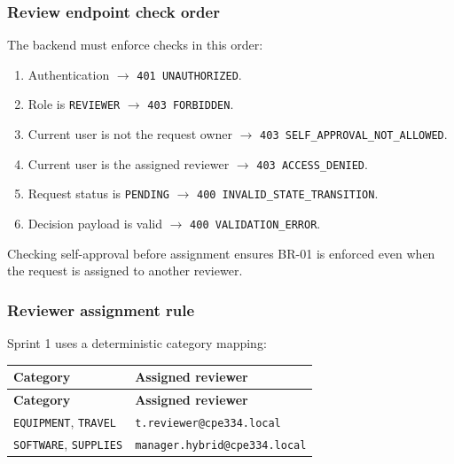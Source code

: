 \documentclass[11pt,a4paper]{article}
\begin{document}
\subsubsection{Review endpoint check order}

The backend must enforce checks in this order:\\

\begin{enumerate}[leftmargin=*,itemsep=2pt,topsep=2pt]
  \item Authentication $\rightarrow$ \texttt{401 UNAUTHORIZED}.
  \item Role is \texttt{REVIEWER} $\rightarrow$ \texttt{403 FORBIDDEN}.
  \item Current user is not the request owner $\rightarrow$ \texttt{403 SELF\_APPROVAL\_NOT\_ALLOWED}.
  \item Current user is the assigned reviewer $\rightarrow$ \texttt{403 ACCESS\_DENIED}.
  \item Request status is \texttt{PENDING} $\rightarrow$ \texttt{400 INVALID\_STATE\_TRANSITION}.
  \item Decision payload is valid $\rightarrow$ \texttt{400 VALIDATION\_ERROR}.
\end{enumerate}
Checking self-approval before assignment ensures BR-01 is enforced even when the request is assigned to another reviewer.\\

\subsubsection{Reviewer assignment rule}

Sprint 1 uses a deterministic category mapping:\\

\vspace{0.3em}
\begin{longtable}{|>{\RaggedRight}p{4.5cm}|>{\RaggedRight}p{11.3cm}|}
\hline
\rowcolor{zenPale}\textbf{Category} & \textbf{Assigned reviewer} \\ \hline
\endfirsthead
\hline
\rowcolor{zenPale}\textbf{Category} & \textbf{Assigned reviewer} \\ \hline
\endhead
\hline
\endfoot
\texttt{EQUIPMENT}, \texttt{TRAVEL} & \texttt{t.\allowbreak reviewer@cpe334.\allowbreak local} \\ \hline
\texttt{SOFTWARE}, \texttt{SUPPLIES} & \texttt{manager.\allowbreak hybrid@cpe334.\allowbreak local} \\ \hline
\end{longtable}
\vspace{0.3em}
\end{document}
